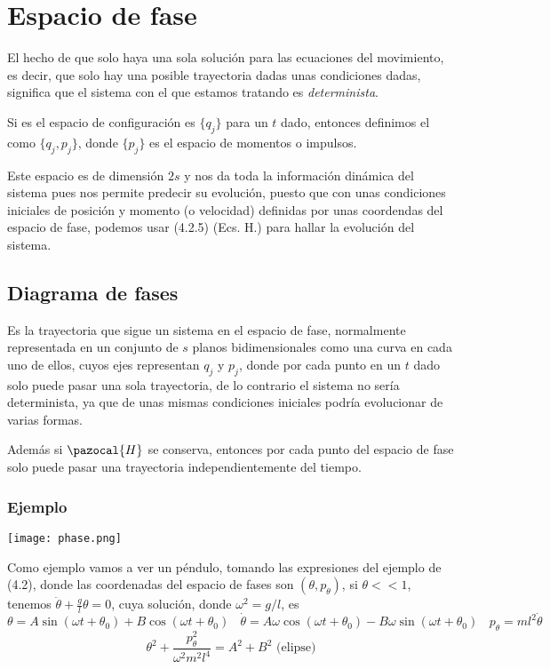 \section{Espacio de fase} 
El hecho de que solo haya una sola solución para las ecuaciones del movimiento, es decir, que solo hay una posible trayectoria dadas unas condiciones dadas, significa que el sistema con el que estamos tratando es \textit{determinista}.

Si es el espacio de configuración es $\{q_j\}$ para un $t$ dado, entonces definimos el  como $\{q_j,p_j\}$, donde $\{p_j\}$ es el espacio de momentos o impulsos.

Este espacio es de dimensión $2s$ y nos da toda la información dinámica del sistema pues nos permite predecir su evolución, puesto que con unas condiciones iniciales de posición y momento (o velocidad) definidas por unas coordendas del espacio de fase, podemos usar (4.2.5) (Ecs. H.) para hallar la evolución del sistema.

\subsection{Diagrama de fases}
Es la trayectoria que sigue un sistema en el espacio de fase, normalmente representada en un conjunto de $s$ planos bidimensionales como una curva en cada uno de ellos, cuyos ejes representan $q_j$ y $p_j$, donde por cada punto en un $t$ dado solo puede pasar una sola trayectoria, de lo contrario el sistema no sería determinista, ya que de unas mismas condiciones iniciales podría evolucionar de varias formas.

Además si $\pazocal{H}$ se conserva, entonces por cada punto del espacio de fase solo puede pasar una trayectoria independientemente del tiempo.

\subsubsection{Ejemplo}
\begin{marginfigure}[0cm]
	\texttt{[image: phase.png]}
\end{marginfigure}
Como ejemplo vamos a ver un péndulo, tomando las expresiones del ejemplo de (4.2), donde las coordenadas del espacio de fases son $(\theta,p_\theta)$, si $\theta << 1$, tenemos $\ddot{\theta}+\frac{g}{l}\theta=0$, cuya solución, donde $\omega^2=g/l$, es
\[\theta = A \sin{(\omega t + \theta_0)}+ B \cos{(\omega t + \theta_0)} \ \ \ \ \dot{\theta} = A\omega \cos{(\omega t + \theta_0)}- B \omega \sin{(\omega t + \theta_0)} \ \ \ \ p_\theta = ml^2 \dot{\theta}\]
\[\theta^2 + \frac{p_\theta^2}{\omega^2 m^2l^4}=A^2+B^2 \mbox{ (elipse)}\]
